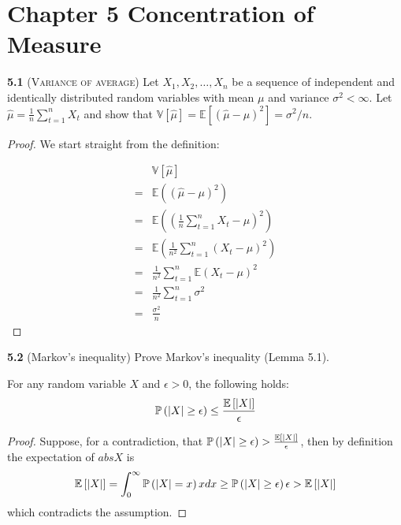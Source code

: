 \chapter*{Chapter 5 Concentration of Measure}
\label{sec:5}

\noindent\textbf{5.1}
(\textsc{Variance of average})
Let $X_{1}, X_{2}, \ldots, X_{n}$ be a sequence of independent and identically distributed random variables with mean $\mu$ and variance $\sigma^{2}<\infty$.
Let $\hat{\mu}=\frac{1}{n} \sum_{t=1}^{n} X_{t}$ and show that $\mathbb{V}[\hat{\mu}]=\mathbb{E}\left[(\hat{\mu}-\mu)^{2}\right]=\sigma^{2} / n$.

\begin{proof}
	We start straight from the definition:

	\begin{equation*}
		\begin{aligned}
		&\mathbb{V}[\hat{\mu}]\\
		= &\mathbb{E}((\hat{\mu }-\mu)^2)\\
		= &\mathbb{E}((\frac{1}{n}\sum_{t=1}^{n}{X_t}-\mu)^2)\\
		= &\mathbb{E}(\frac{1}{n^2}\sum_{t=1}^{n}{(X_t - \mu)^2})\\
		= &\frac{1}{n^2}\sum_{t=1}^{n}{\mathbb{E}(X_t - \mu)^2}\\
		= &\frac{1}{n^2}\sum_{t=1}^{n}{\sigma^2}\\
		= &\frac{\sigma^2}{n}
		\end{aligned}
	\end{equation*}			

\end{proof}

\noindent\textbf{5.2}
(Markov’s inequality) Prove Markov’s inequality (Lemma 5.1).
\begin{lemma}
    For any random variable $X$ and $\epsilon>0$, the following holds:
    \begin{align*}
        \mathbb{P} \left(\left| X \right|\geq \epsilon\right)\leq \frac{\mathbb{E} \left[\left| X \right|\right]}{\epsilon}
    \end{align*}
\end{lemma}
\begin{proof}
    Suppose, for a contradiction, that $\mathbb{P} \left(\left| X \right|\geq \epsilon\right)> \frac{\mathbb{E} \left[\left| X \right|\right]}{\epsilon}$, then by definition the expectation of $abs{X}$ is
    \begin{align*}
        \mathbb{E} \left[\left| X \right|\right]=\int_{0}^{\infty} \mathbb{P} \left(\left| X \right|=x\right)xdx \geq \mathbb{P} \left(\left| X \right|\geq \epsilon\right) \epsilon > \mathbb{E} \left[\left| X \right|\right]
    \end{align*}
    which contradicts the assumption.
\end{proof}

